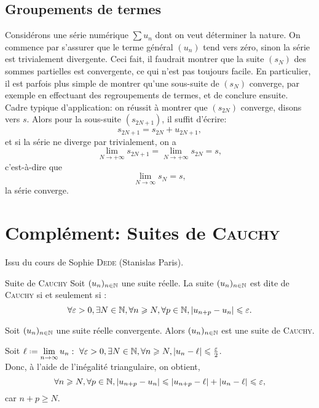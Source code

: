\subsection{Groupements de termes}

Considérons une série numérique $\sum u_n$ dont on veut déterminer la nature. On commence par s'assurer que le terme général $(u_n)$ tend vers zéro, sinon la série est trivialement divergente. Ceci fait, il faudrait montrer que la suite $(s_N)$ des sommes partielles est convergente, ce qui n'est pas toujours facile. En particulier, il est parfois plus simple de montrer qu'une sous-suite de $(s_N)$ converge, par exemple en effectuant des regroupements de termes, et de conclure ensuite. \\
Cadre typique d'application: on réussit à montrer que $(s_{2N})$ converge, disons vers $s$. Alors pour la sous-suite $(s_{2N+1})$, il suffit d'écrire:
$$s_{2N+1} = s_{2N} + u_{2N+1},$$
et si la série ne diverge par trivialement, on a
$$\lim_{N \to + \infty} s_{2N+1} = \lim_{N \to + \infty} s_{2N} = s,$$
c'est-à-dire que 
$$\lim_{N \to \infty} s_N = s,$$
la série converge. 

\section{Complément: Suites de \textsc{Cauchy}}

Issu du cours de Sophie \textsc{Dede} (Stanislas Paris). \\
\begin{defi}{Suite de \textsc{Cauchy}}
    Soit $(u_n)_{n \in \mathbb{N}}$ une suite réelle. La suite $(u_n)_{n \in \mathbb{N}}$ est dite de \textsc{Cauchy} si et seulement si :
    $$\forall \varepsilon > 0, \exists N \in \mathbb{N}, \forall n \geqslant N, \forall p \in \mathbb{N}, |u_{n+p} - u_n| \leqslant \varepsilon.$$
\end{defi}

\begin{prop}{}
    Soit $(u_n)_{n \in \mathbb{N}}$ une suite réelle convergente. Alors  $(u_n)_{n \in \mathbb{N}}$ est une suite de \textsc{Cauchy}.
\end{prop}

\begin{preuve}
    Soit $\ell \defeq \lim\limits_{n \to \infty} u_n:\ \forall \varepsilon > 0, \exists N \in \N, \forall n \geqslant N, |u_n - \ell| \leqslant \frac{\varepsilon}{2}$. \\
    Donc, à l'aide de l'inégalité triangulaire, on obtient,
    $$\forall n \geqslant N, \forall p \in \mathbb{N}, |u_{n+p} - u_n| \leqslant |u_{n+p} - \ell| + |u_n - \ell| \leqslant \varepsilon,$$
    car $n + p \geqslant N$.
\end{preuve}


